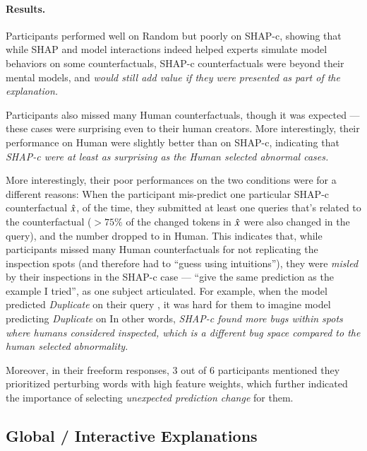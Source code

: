 \paragraph{Results.}
Participants performed well on Random but poorly on SHAP-c, showing that while SHAP and model interactions indeed helped experts simulate model behaviors on some counterfactuals, SHAP-c counterfactuals were beyond their mental models, and \emph{would still add value if they were presented as part of the explanation.}

Participants also missed many Human counterfactuals, though it was expected --- these cases were surprising even to their human creators.
More interestingly, their performance on Human were slightly better than on SHAP-c, indicating that \emph{SHAP-c were at least as surprising as the Human selected abnormal cases.}

More interestingly, their poor performances on the two conditions were for a different reasons: 
When the participant mis-predict one particular SHAP-c counterfactual $\hat{x}$,  of the time, they submitted at least one queries that's related to the counterfactual (\ie $>75\%$ of the changed tokens in $\hat{x}$ were also changed in the query), and the number dropped to  in Human.
This indicates that, while participants missed many Human counterfactuals for not replicating the inspection spots (and therefore had to ``guess using intuitions''), they were \emph{misled} by their inspections in the SHAP-c case --- ``give the same prediction as the example I tried'', as one subject articulated.
For example, when the model predicted \emph{Duplicate} on their query , it was hard for them to imagine model predicting \emph{Duplicate} on  
In other words, \emph{SHAP-c found more bugs within spots where humans considered inspected, which is a different bug space compared to the human selected abnormality.}

Moreover, in their freeform responses, 3 out of 6 participants mentioned they prioritized perturbing words with high feature weights, which further indicated the importance of selecting \emph{unexpected prediction change} for them.




\subsection{Global / Interactive Explanations}
\label{subsec:global_exp}

